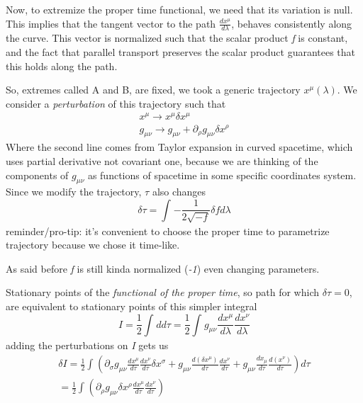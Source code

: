 Now, to extremize the proper time functional, we need that its variation is null. This implies that the tangent vector to the path $\frac{d x^{\mu }}{d \lambda }$, behaves consistently along the curve. This vector is normalized such that the scalar product \emph{f} is constant, and the fact that parallel transport preserves the scalar product guarantees that this holds along the path.\par
So, extremes called A and B, are fixed, we took a generic trajectory $x^{\mu }\left( \lambda  \right)$.
We consider a \emph{perturbation} of this trajectory such that
\begin{gather*}
x^{\mu  }\to x^{\mu }\delta x^{\mu } \\
g_{\mu \nu } \to  g_{\mu \nu } + \partial_{\rho }g_{\mu \nu } \delta  x^{\rho }
\end{gather*}
Where the second line comes from Taylor expansion in curved spacetime, which uses partial derivative not covariant one, because we are thinking of the components of $g_{\mu \nu }$ as functions of spacetime in some specific coordinates system.
Since we modify the trajectory, $\tau $ also changes
\[
	\delta \tau = \int_{}^{}{-\frac{1}{2\sqrt{-f}}\delta f d\lambda }

\]
{\footnotesize reminder/pro-tip: it's convenient to choose the proper time to parametrize trajectory because we chose it time-like.}\par

As said before \emph{f} is still kinda normalized (\emph{-1}) even changing parameters. 

Stationary points of the \emph{functional of the proper time}, so path for which $\delta  \tau =0$, are equivalent to stationary points of this simpler integral
\[
I = \frac{1}{2} \int_{}^{}{d d\tau } = \frac{1}{2} \int_{}^{}{g_{\mu \nu }\frac{d x^{\mu }}{d \lambda }\frac{d x^{\nu }}{d \lambda }}
\]
adding the perturbations on \emph{I} gets us
\begin{gather*}
\delta I = \frac{1}{2} \int_{}^{}{\left( \partial_{\sigma }g_{\mu \nu }\frac{d x^{\mu }}{d \tau }\frac{d x^{\nu }}{d \tau }\delta x^{\sigma } + g_{\mu \nu } \frac{d \left( \delta x^{\mu } \right)}{d \tau }\frac{d x^{\nu }}{d \tau } + g_{\mu \nu }\frac{d x_{\mu }}{d \tau } \frac{d \left( x^{\nu } \right)}{d \tau } \right)d\tau } \\
= \frac{1}{2} \int_{}^{}{\left( \partial_{\rho }g_{\mu \nu }\delta x^{\rho } \frac{d x^{\mu }}{d \tau } \frac{d x^{\nu }}{d \tau } \right)}
\end{gather*}































